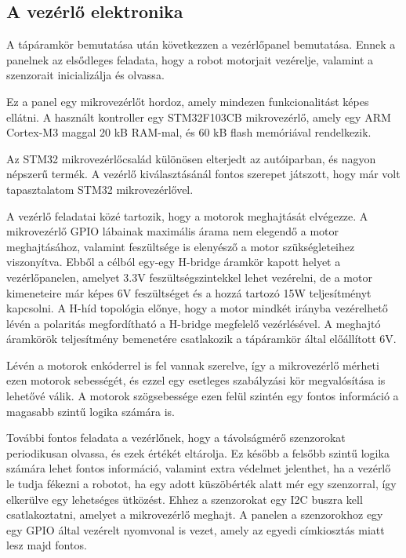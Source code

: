 
\subsection{A vezérlő elektronika}
A tápáramkör bemutatása után következzen a vezérlőpanel bemutatása. Ennek a
panelnek az elsődleges feladata, hogy a robot motorjait vezérelje, valamint
a szenzorait inicializálja és olvassa.

Ez a panel egy mikrovezérlőt hordoz, amely mindezen funkcionalitást képes
ellátni. A használt kontroller egy STM32F103CB mikrovezérlő, amely egy
ARM Cortex-M3 maggal 20 kB RAM-mal, és 60 kB flash memóriával rendelkezik.

Az STM32 mikrovezérlőcsalád különösen elterjedt az autóiparban, és nagyon
népszerű termék. A vezérlő kiválasztásánál fontos szerepet játszott, hogy már
volt tapasztalatom STM32 mikrovezérlővel.

\medskip

A vezérlő feladatai közé tartozik, hogy a motorok meghajtását elvégezze. A
mikrovezérlő GPIO lábainak maximális árama nem elegendő a motor meghajtásához,
valamint feszültsége is elenyésző a motor szükségleteihez viszonyítva. Ebből a
célból egy-egy H-bridge áramkör kapott helyet a vezérlőpanelen, amelyet 3.3V
feszültségszintekkel lehet vezérelni, de a motor kimeneteire már képes 6V
feszültséget és a hozzá tartozó 15W teljesítményt kapcsolni. A H-híd topológia
előnye, hogy a motor mindkét irányba vezérelhető lévén a polaritás megfordítható
a H-bridge megfelelő vezérlésével. A meghajtó áramkörök teljesítmény bemenetére
csatlakozik a tápáramkör által előállított 6V.

Lévén a motorok enkóderrel is fel vannak szerelve, így a mikrovezérlő mérheti
ezen motorok sebességét, és ezzel egy esetleges szabályzási kör megvalósítása is
lehetővé válik. A motorok szögsebessége ezen felül szintén egy fontos információ
a magasabb szintű logika számára is.

További fontos feladata a vezérlőnek, hogy a távolságmérő szenzorokat
periodikusan olvassa, és ezek értékét eltárolja. Ez később a felsőbb szintű
logika számára lehet fontos információ, valamint extra védelmet jelenthet, ha a
vezérlő le tudja fékezni a robotot, ha egy adott küszöbérték alatt mér egy
szenzorral, így elkerülve egy lehetséges ütközést. Ehhez a szenzorokat egy I2C
buszra kell csatlakoztatni, amelyet a mikrovezérlő meghajt. A panelen a
szenzorokhoz egy egy GPIO által vezérelt nyomvonal is vezet, amely az egyedi
címkiosztás miatt lesz majd fontos.

